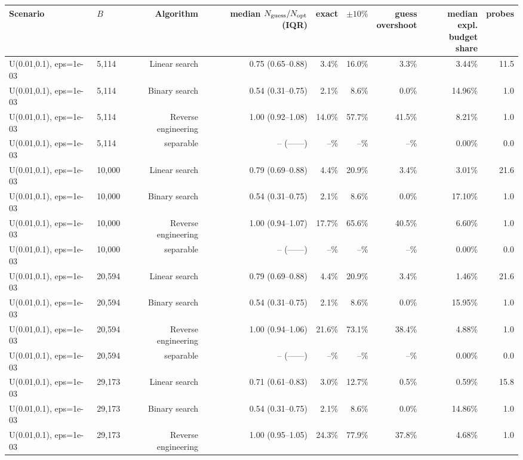 \begin{tabular}{llrrrrrrr}
\toprule
Scenario & $B$ & Algorithm & \makecell{median\\$N_{\rm guess}/N_{\rm opt}$ (IQR)} & exact & $\pm10\%$ & \makecell{guess\\overshoot} & \makecell{median expl.\\budget share} & probes \\
\midrule
U(0.01,0.1), eps=1e-03 & 5,114 & Linear search & 0.75 (0.65--0.88) & 3.4\% & 16.0\% & 3.3\% & 3.44\% & 11.5 \\
U(0.01,0.1), eps=1e-03 & 5,114 & Binary search & 0.54 (0.31--0.75) & 2.1\% & 8.6\% & 0.0\% & 14.96\% & 1.0 \\
U(0.01,0.1), eps=1e-03 & 5,114 & Reverse engineering & 1.00 (0.92--1.08) & 14.0\% & 57.7\% & 41.5\% & 8.21\% & 1.0 \\
U(0.01,0.1), eps=1e-03 & 5,114 & separable & -- (------) & --\% & --\% & --\% & 0.00\% & 0.0 \\
U(0.01,0.1), eps=1e-03 & 10,000 & Linear search & 0.79 (0.69--0.88) & 4.4\% & 20.9\% & 3.4\% & 3.01\% & 21.6 \\
U(0.01,0.1), eps=1e-03 & 10,000 & Binary search & 0.54 (0.31--0.75) & 2.1\% & 8.6\% & 0.0\% & 17.10\% & 1.0 \\
U(0.01,0.1), eps=1e-03 & 10,000 & Reverse engineering & 1.00 (0.94--1.07) & 17.7\% & 65.6\% & 40.5\% & 6.60\% & 1.0 \\
U(0.01,0.1), eps=1e-03 & 10,000 & separable & -- (------) & --\% & --\% & --\% & 0.00\% & 0.0 \\
U(0.01,0.1), eps=1e-03 & 20,594 & Linear search & 0.79 (0.69--0.88) & 4.4\% & 20.9\% & 3.4\% & 1.46\% & 21.6 \\
U(0.01,0.1), eps=1e-03 & 20,594 & Binary search & 0.54 (0.31--0.75) & 2.1\% & 8.6\% & 0.0\% & 15.95\% & 1.0 \\
U(0.01,0.1), eps=1e-03 & 20,594 & Reverse engineering & 1.00 (0.94--1.06) & 21.6\% & 73.1\% & 38.4\% & 4.88\% & 1.0 \\
U(0.01,0.1), eps=1e-03 & 20,594 & separable & -- (------) & --\% & --\% & --\% & 0.00\% & 0.0 \\
U(0.01,0.1), eps=1e-03 & 29,173 & Linear search & 0.71 (0.61--0.83) & 3.0\% & 12.7\% & 0.5\% & 0.59\% & 15.8 \\
U(0.01,0.1), eps=1e-03 & 29,173 & Binary search & 0.54 (0.31--0.75) & 2.1\% & 8.6\% & 0.0\% & 14.86\% & 1.0 \\
U(0.01,0.1), eps=1e-03 & 29,173 & Reverse engineering & 1.00 (0.95--1.05) & 24.3\% & 77.9\% & 37.8\% & 4.68\% & 1.0 \\

\end{tabular}
